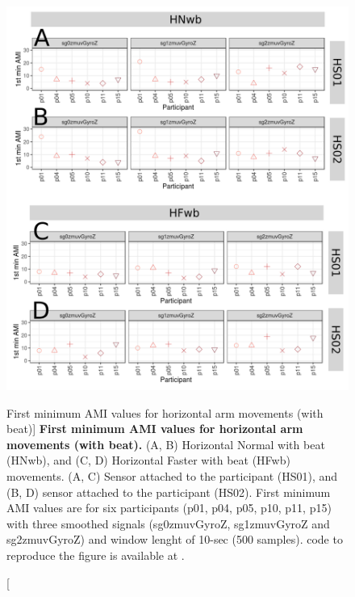 \begin{figure}
\centering
\includegraphics[width=1.0\textwidth]{ami_Hwb_w10}
	\caption
	[First minimum AMI values for horizontal arm movements (with beat)]{
	{\bf First minimum AMI values for horizontal arm movements (with beat).}
		(A, B) Horizontal Normal with beat (HNwb), and 
		(C, D) Horizontal Faster with beat (HFwb) movements.
		(A, C) Sensor attached to the participant (HS01), and
		(B, D) sensor attached to the participant (HS02).
		First minimum AMI values are for six participants 
		(p01, p04, p05, p10, p11, p15) with three smoothed 
		signals (sg0zmuvGyroZ, sg1zmuvGyroZ and sg2zmuvGyroZ) and 
		window lenght of 10-sec (500 samples).
		\R code to reproduce the figure is available at 
		.
        }
    \label{fig:amiHwb}
\end{figure}

